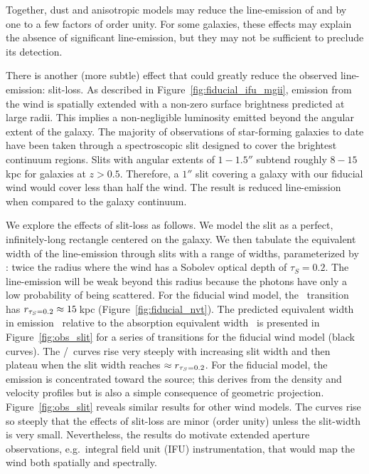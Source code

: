 \documentclass[12pt,preprint]{aastex}
\begin{document}
Together, dust and anisotropic models may reduce the line-emission
of  and 
by one to a few factors of order unity.  For some galaxies, these
effects may explain the absence of significant line-emission,
but they may not be sufficient to preclude its detection. 

There is another (more subtle) effect that could
greatly reduce the observed line-emission: slit-loss.  As
described in Figure~\ref{fig:fiducial_ifu_mgii}, 
emission from the wind is spatially extended with
a non-zero surface brightness predicted at large radii. This implies 
a non-negligible luminosity emitted beyond the angular extent of the galaxy.  
The majority of observations of star-forming galaxies to date have
been taken through a spectroscopic slit designed to cover
the brightest continuum regions. Slits with angular
extents of $1-1.5''$ subtend roughly $8-15$\,kpc for galaxies at $z>0.5$.
Therefore, a $1''$ slit covering a galaxy with our fiducial wind would cover
less than half the wind.  The result is reduced line-emission
when compared to the galaxy continuum.

We explore the effects of slit-loss as follows.
We model the slit as a perfect, infinitely-long rectangle centered on the
galaxy.  We then tabulate the equivalent width of the line-emission
through slits with a range of widths, parameterized by \rtt: twice the radius
where the wind has a Sobolev optical depth of $\tau_S = 0.2$. 
The line-emission will be weak beyond
this radius because the photons have only a low probability of
being scattered.  For the fiducial wind model, 
the \mgiia\ transition has $r_{\tau_S = 0.2} \approx 15$\,kpc 
(Figure~\ref{fig:fiducial_nvt}).  
The predicted equivalent width in emission \ewe\ relative to the absorption
equivalent width \ewabs\ is presented in
Figure~\ref{fig:obs_slit} for a series of transitions for the fiducial
wind model (black curves).
The \ewe/\ewabs\ curves rise very steeply with increasing slit width and then
plateau when the slit width reaches $\approx r_{\tau_S = 0.2}$.  
For the fiducial model, the emission is concentrated toward the source; this
derives from the density and velocity profiles but is also a simple
consequence of geometric projection.
Figure~\ref{fig:obs_slit} reveals similar results for other wind
models. The curves rise so steeply that 
the effects of slit-loss are minor (order unity)
unless the slit-width is very small.   
Nevertheless, the results do motivate
extended aperture observations, e.g.\ integral field unit (IFU)
instrumentation, that would map the wind both spatially and spectrally.
\end{document}
